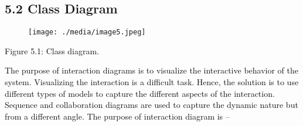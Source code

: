 \documentclass[12pt]{report}
\renewcommand{\_}{\kern-1.5pt\textunderscore\kern-1.5pt}
\begin{document}
\vspace{\baselineskip}
\begin{adjustwidth}{0.3in}{0.84in}
\subsection*{5.2 Class Diagram}
\end{adjustwidth}


\vspace{\baselineskip}

\vspace{\baselineskip}



\begin{figure}[H]
	\begin{Center}
		\texttt{[image: ./media/image5.jpeg]}
	\end{Center}
\end{figure}



\par


\vspace{\baselineskip}
\begin{adjustwidth}{0.3in}{0.84in}
\textcolor[HTML]{0D0D0D}{Figure 5.1: Class diagram.}\par

\end{adjustwidth}


\vspace{\baselineskip}
\vspace{\baselineskip}
\begin{adjustwidth}{0.3in}{0.84in}
{\fontsize{13pt}{15.6pt}\selectfont \textbf{\textcolor[HTML]{0D0D0D}{5.4 Purpose of Sequence Diagram\par} }}\par

\end{adjustwidth}


\vspace{\baselineskip}
\begin{adjustwidth}{0.3in}{0.84in}
\textcolor[HTML]{0D0D0D}{The purpose of interaction diagrams is to visualize the interactive behavior of the system. Visualizing the interaction is a difficult task. Hence, the solution is to use different types of models to capture the different aspects of the interaction. Sequence and collaboration diagrams are used to capture the dynamic nature but from a different angle. The purpose of interaction diagram is – }\par

\end{adjustwidth}
\end{document}
